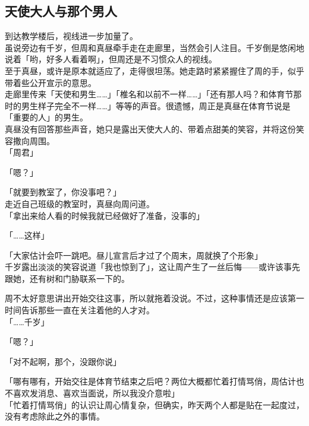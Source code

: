 \subsection{天使大人与那个男人}

到达教学楼后，视线进一步加量了。\\

虽说旁边有千岁，但周和真昼牵手走在走廊里，当然会引人注目。千岁倒是悠闲地说着「哟，好多人看着啊」，但周还是不习惯众人的视线。\\

至于真昼，或许是原本就适应了，走得很坦荡。她走路时紧紧握住了周的手，似乎带着些公开宣示的意思。\\

走廊里传来「天使和男生……」「椎名和以前不一样……」「还有那人吗？和体育节那时的男生样子完全不一样……」等等的声音。很遗憾，周正是真昼在体育节说是「重要的人」的男生。\\

真昼没有回答那些声音，她只是露出天使大人的、带着点甜美的笑容，并将这份笑容撒向周围。\\

「周君」

「嗯？」

「就要到教室了，你没事吧？」\\

走近自己班级的教室时，真昼向周问道。\\

「拿出来给人看的时候我就已经做好了准备，没事的」

「……这样」

「大家估计会吓一跳吧。昼儿宣言后才过了个周末，周就换了个形象」\\

千岁露出淡淡的笑容说道「我也惊到了」，这让周产生了一丝后悔——或许该事先跟她，还有树和门胁联系一下的。

周不太好意思讲出开始交往这事，所以就拖着没说。不过，这种事情还是应该第一时间告诉那些一直在关注着他的人才对。\\

「……千岁」

「嗯？」

「对不起啊，那个，没跟你说」

「哪有哪有，开始交往是体育节结束之后吧？两位大概都忙着打情骂俏，周估计也不喜欢发消息、喜欢当面说，所以我没介意啦」\\

「忙着打情骂俏」的认识让周心情复杂，但确实，昨天两个人都是贴在一起度过，没有考虑除此之外的事情。

